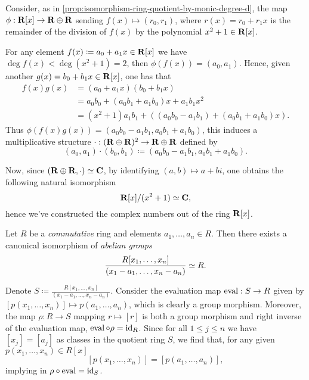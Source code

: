 \begin{example}[Constructing \(\CC\)]
    \label{exp:complex-numbers-from-R[x]}
    Consider, as in \cref{prop:isomorphism-ring-quotient-by-monic-degree-d}, the map
    \(\phi: \mathbf{R}[x] \to \mathbf{R} \oplus \mathbf{R}\) sending \(f(x) \mapsto (r_0, r_1)\), where
    \(r(x) = r_0 + r_1 x\) is the remainder of the division of \(f(x)\) by the
    polynomial \(x^2 + 1 \in \mathbf{R}[x]\).

    For any element \(f(x) \coloneq a_0 + a_1 x \in \mathbf{R}[x]\) we have
    \(\deg f(x) < \deg(x^2 + 1) = 2\), then \(\phi(f(x)) = (a_0, a_1)\). Hence,
    given another \(g(x) = b_0 + b_1 x \in \mathbf{R}[x]\), one has that
    \begin{align*}
        f(x) g(x)
         & = (a_0 + a_1 x) (b_0 + b_1 x)                                       \\
         & = a_0 b_0 + (a_0 b_1 + a_1 b_0) x + a_1 b_1 x^2                     \\
         & = (x^2 + 1) a_1 b_1 + ((a_0 b_0 - a_1 b_1) + (a_0 b_1 + a_1 b_0)x).
    \end{align*}
    Thus \(\phi(f(x) g(x)) = (a_0 b_0 - a_1 b_1, a_0 b_1 + a_1 b_0)\), this induces
    a multiplicative structure \(\cdot: (\mathbf{R} \oplus \mathbf{R})^2 \to \mathbf{R} \oplus \mathbf{R}\) defined
    by
    \[
        (a_0, a_1) \cdot (b_0, b_1) \coloneq (a_0 b_0 - a_1 b_1, a_0 b_1 + a_1 b_0).
    \]

    Now, since \((\mathbf{R} \oplus \mathbf{R}, \cdot) \simeq \mathbf{C}\), by identifying \((a, b) \mapsto a
    + b i\), one obtains the following natural isomorphism
    \[
        \mathbf{R}[x]/(x^2 + 1) \simeq \mathbf{C},
    \]
    hence we've constructed the complex numbers out of the ring \(\mathbf{R}[x]\).
\end{example}

\begin{example}
    \label{exp:multiple-var-eval-isomorphism}
    Let \(R\) be a \emph{commutative} ring and elements \(a_1, \dots, a_n \in
    R\). Then there exists a canonical isomorphism of \emph{abelian groups}
    \[
        \frac{R[x_1, \dots, x_n]}{(x_1 - a_1, \dots, x_n - a_n)} \simeq R.
    \]

    Denote \(S \coloneq \frac{R[x_1, \dots, x_n]}{(x_1 - a_1, \dots, x_n -
        a_n)}\). Consider the evaluation map \(\operatorname{eval}: S \to R\) given by
    \([p(x_1, \dots, x_n)] \mapsto p(a_1, \dots, a_n)\), which is clearly a group
    morphism. Moreover, the map \(\rho: R \to S\) mapping \(r \mapsto [r]\) is both
    a group morphism and right inverse of the evaluation map,
    \(\operatorname{eval} \circ \rho = \operatorname{id}_R\). Since for all \(1 \leq j \leq n\) we have
    \([x_j] = [a_j]\) as classes in the quotient ring \(S\), we find that, for any
    given \(p(x_1,\dots, x_n) \in R[x]\)
    \[
        [p(x_1, \dots, x_n)] = [p(a_1, \dots, a_n)],
    \]
    implying in \(\rho \circ \operatorname{eval} = \operatorname{id}_S\).
\end{example}

